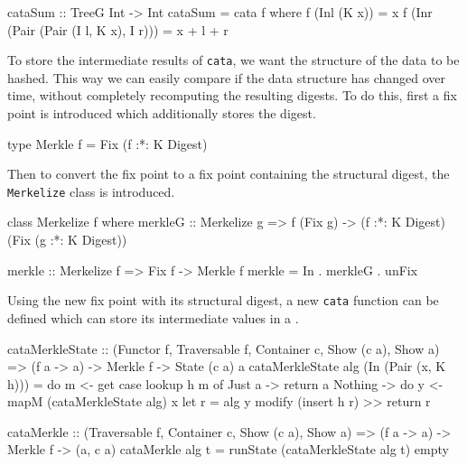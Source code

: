 \begin{haskell}
cataSum :: TreeG Int -> Int
cataSum = cata f
  where
    f (Inl (K x))                         = x
    f (Inr (Pair (Pair (I l, K x), I r))) = x + l + r
\end{haskell}

To store the intermediate results of \texttt{cata}, we want the structure of the data to be hashed. This way we can easily compare if the data structure has changed over time, without completely recomputing the resulting digests. To do this, first a fix point is introduced which additionally stores the digest.

\begin{haskell}
type Merkle f = Fix (f :*: K Digest)
\end{haskell}

Then to convert the fix point to a fix point containing the structural digest, the \texttt{Merkelize} class is introduced. 

\begin{haskell}
class Merkelize f where
    merkleG :: Merkelize g => f (Fix g) -> (f :*: K Digest) (Fix (g :*: K Digest))

merkle :: Merkelize f => Fix f -> Merkle f
merkle = In . merkleG . unFix
\end{haskell}

Using the new fix point with its structural digest, a new \texttt{cata} function can be defined which can store its intermediate values in a . 

\begin{haskell}
cataMerkleState :: (Functor f, Traversable f, Container c, Show (c a), Show a)
                => (f a -> a) -> Merkle f -> State (c a) a
cataMerkleState alg (In (Pair (x, K h))) = do m <- get
  case lookup h m of
    Just a  -> return a
    Nothing -> do y <- mapM (cataMerkleState alg) x
               let r = alg y
               modify (insert h r) >> return r

cataMerkle :: (Traversable f, Container c, Show (c a), Show a)
           => (f a -> a) -> Merkle f -> (a, c a)
cataMerkle alg t = runState (cataMerkleState alg t) empty
\end{haskell}